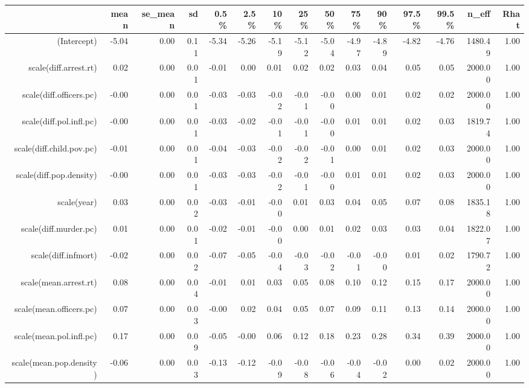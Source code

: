 \begin{table}[ht]
\centering
\begin{tabular}{rrrrrrrrrrrrrrr}
  \hline
 & mean & se\_mean & sd & 0.5\% & 2.5\% & 10\% & 25\% & 50\% & 75\% & 90\% & 97.5\% & 99.5\% & n\_eff & Rhat \\ 
  \hline
(Intercept) & -5.04 & 0.00 & 0.11 & -5.34 & -5.26 & -5.19 & -5.12 & -5.04 & -4.97 & -4.89 & -4.82 & -4.76 & 1480.49 & 1.00 \\ 
  scale(diff.arrest.rt) & 0.02 & 0.00 & 0.01 & -0.01 & 0.00 & 0.01 & 0.02 & 0.02 & 0.03 & 0.04 & 0.05 & 0.05 & 2000.00 & 1.00 \\ 
  scale(diff.officers.pc) & -0.00 & 0.00 & 0.01 & -0.03 & -0.03 & -0.02 & -0.01 & -0.00 & 0.00 & 0.01 & 0.02 & 0.02 & 2000.00 & 1.00 \\ 
  scale(diff.pol.infl.pc) & -0.00 & 0.00 & 0.01 & -0.03 & -0.02 & -0.01 & -0.01 & -0.00 & 0.01 & 0.01 & 0.02 & 0.03 & 1819.74 & 1.00 \\ 
  scale(diff.child.pov.pc) & -0.01 & 0.00 & 0.01 & -0.04 & -0.03 & -0.02 & -0.02 & -0.01 & 0.00 & 0.01 & 0.02 & 0.03 & 2000.00 & 1.00 \\ 
  scale(diff.pop.density) & -0.00 & 0.00 & 0.01 & -0.03 & -0.03 & -0.02 & -0.01 & -0.00 & 0.01 & 0.01 & 0.02 & 0.03 & 2000.00 & 1.00 \\ 
  scale(year) & 0.03 & 0.00 & 0.02 & -0.03 & -0.01 & -0.00 & 0.01 & 0.03 & 0.04 & 0.05 & 0.07 & 0.08 & 1835.18 & 1.00 \\ 
  scale(diff.murder.pc) & 0.01 & 0.00 & 0.01 & -0.02 & -0.01 & -0.00 & 0.00 & 0.01 & 0.02 & 0.03 & 0.03 & 0.04 & 1822.07 & 1.00 \\ 
  scale(diff.infmort) & -0.02 & 0.00 & 0.02 & -0.07 & -0.05 & -0.04 & -0.03 & -0.02 & -0.01 & -0.00 & 0.01 & 0.02 & 1790.72 & 1.00 \\ 
  scale(mean.arrest.rt) & 0.08 & 0.00 & 0.04 & -0.01 & 0.01 & 0.03 & 0.05 & 0.08 & 0.10 & 0.12 & 0.15 & 0.17 & 2000.00 & 1.00 \\ 
  scale(mean.officers.pc) & 0.07 & 0.00 & 0.03 & -0.00 & 0.02 & 0.04 & 0.05 & 0.07 & 0.09 & 0.11 & 0.13 & 0.14 & 2000.00 & 1.00 \\ 
  scale(mean.pol.infl.pc) & 0.17 & 0.00 & 0.09 & -0.05 & -0.00 & 0.06 & 0.12 & 0.18 & 0.23 & 0.28 & 0.34 & 0.39 & 2000.00 & 1.00 \\ 
  scale(mean.pop.density) & -0.06 & 0.00 & 0.03 & -0.13 & -0.12 & -0.09 & -0.08 & -0.06 & -0.04 & -0.02 & 0.00 & 0.02 & 2000.00 & 1.00 \\ 

\end{tabular}
\end{table}
